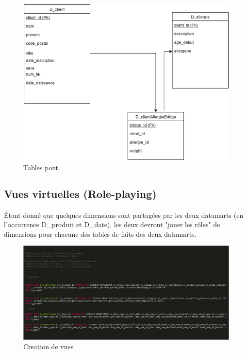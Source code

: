     \begin{figure}[h]
        \centerline{\includegraphics[scale=0.9]{schemaBridge.png}}
        \caption{Tables pont}
        \label{fig:UML}
    \end{figure}
    
    
\subsection{Vues virtuelles (Role-playing)}
\paragraph{} Étant donné que quelques dimensions sont partagées par les deux datamarts (en l’occurrence D\_produit et D\_date), les deux devront "jouer les rôles" de dimensions pour chacune des tables de faits des deux datamarts.

    \begin{figure}[h]
        \centerline{\includegraphics[scale=0.9]{screenTerm1.png}}
        \caption{Creation de vues}
        \label{fig:UML}
    \end{figure}
    
